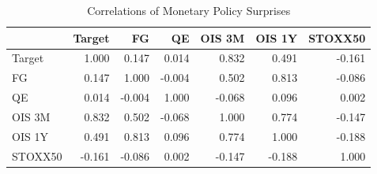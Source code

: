 \begin{table}[!h]
\centering
\caption{Correlations of Monetary Policy Surprises}
\centering
\begin{tabular}[t]{lrrrrrr}
\toprule
  & Target & FG & QE & OIS 3M & OIS 1Y & STOXX50\\
\midrule
Target & 1.000 & 0.147 & 0.014 & 0.832 & 0.491 & -0.161\\
FG & 0.147 & 1.000 & -0.004 & 0.502 & 0.813 & -0.086\\
QE & 0.014 & -0.004 & 1.000 & -0.068 & 0.096 & 0.002\\
OIS 3M & 0.832 & 0.502 & -0.068 & 1.000 & 0.774 & -0.147\\
OIS 1Y & 0.491 & 0.813 & 0.096 & 0.774 & 1.000 & -0.188\\
\addlinespace
STOXX50 & -0.161 & -0.086 & 0.002 & -0.147 & -0.188 & 1.000\\
\bottomrule
\end{tabular}
\end{table}
